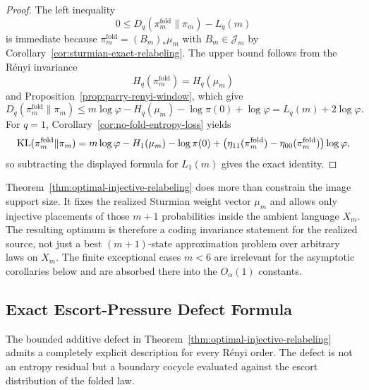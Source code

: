 \begin{proof}
The left inequality
\[
0\le D_q(\pi_m^{\mathrm{fold}}\|\pi_m)-L_q(m)
\]
is immediate because \(\pi_m^{\mathrm{fold}}=(B_m)_*\mu_m\) with
\(B_m\in\mathcal J_m\) by Corollary~\ref{cor:sturmian-exact-relabeling}. The
upper bound follows from the R\'enyi invariance
\[
H_q(\pi_m^{\mathrm{fold}})=H_q(\mu_m)
\]
and Proposition~\ref{prop:parry-renyi-window}, which give
\[
D_q(\pi_m^{\mathrm{fold}}\|\pi_m)
\le
m\log\varphi-H_q(\mu_m)-\log\pi(0)+\log\varphi
=
L_q(m)+2\log\varphi.
\]
For \(q=1\), Corollary~\ref{cor:no-fold-entropy-loss} yields
\[
\operatorname{KL}(\pi_m^{\mathrm{fold}}\|\pi_m)
=
m\log\varphi-H_1(\mu_m)-\log\pi(0)
+\bigl(\eta_{11}(\pi_m^{\mathrm{fold}})
-\eta_{00}(\pi_m^{\mathrm{fold}})\bigr)\log\varphi,
\]
so subtracting the displayed formula for \(L_1(m)\) gives the exact identity.
\end{proof}

\begin{remark}
\label{rem:injective-relabeling-stronger}
Theorem~\ref{thm:optimal-injective-relabeling} does more than constrain the
image support size. It fixes the realized Sturmian weight vector \(\mu_m\) and
allows only injective placements of those \(m+1\) probabilities inside the
ambient language \(X_m\). The resulting optimum is therefore a coding
invariance statement for the realized source, not just a best \((m+1)\)-state
approximation problem over arbitrary laws on \(X_m\). The finite exceptional
cases \(m<6\) are irrelevant for the asymptotic corollaries below and are
absorbed there into the \(O_\alpha(1)\) constants.
\end{remark}

\subsection{Exact Escort-Pressure Defect Formula}

The bounded additive defect in
Theorem~\ref{thm:optimal-injective-relabeling} admits a completely explicit
description for every R\'enyi order. The defect is not an entropy residual
but a boundary cocycle evaluated against the escort distribution of the
folded law.

